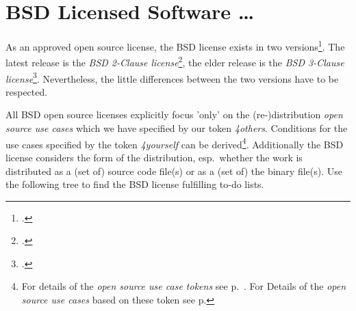 %
%
%
%
%



\section{BSD Licensed Software \ldots}

As an approved open source license, the BSD license exists in two
versions\footcite[Following the Open Source Initiative, initially a not approved
BSD license contained a fourth clause also known as advertising clause which
\enquote{(\ldots) officially was rescinded by the Director of the Office of
Technology Licensing of the University of California on July 22nd, 1999}.
 Cf.][\nopage wp. Because of the cancellation you can simply act according the
 \textit{BSD 3-Clause license} if you have to fulfill the eldest BSD
 license]{BsdLicense3Clause}. The latest release is the \textit{BSD 2-Clause
 license}\footcite[cf.][\nopage wp]{BsdLicense2Clause}, the elder release is the
 \textit{BSD 3-Clause license}\footcite[cf.][\nopage wp]{BsdLicense3Clause}.
 Nevertheless, the little differences between the two versions have to be
 respected.

All BSD open source licenses explicitly focus 'only' on the (re-)distribution
\textit{open source use cases} which we have specified by our token
\textit{4others}. Conditions for the use cases specified by the token
\textit{4yourself} can be derived\footnote{For details of the \textit{open
source use case tokens} see p.\ \pageref{OsucTokens}. For Details of the
\textit{open source use cases} based on these token see p.
\pageref{OsucDefinitionTree} }. Additionally the BSD license considers the form
of the distribution, esp.\ whether the work is distributed as a (set of) source
code file(s) or as a (set of) the binary file(s). Use the following tree to find
the BSD license fulfilling to-do lists.

